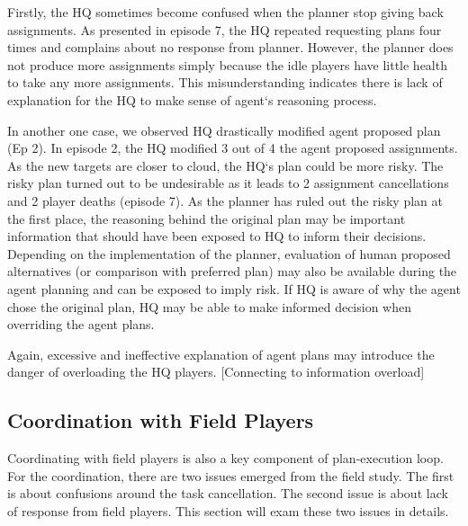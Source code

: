 Firstly, the HQ sometimes become confused when the planner stop giving back assignments. As presented in episode 7, the HQ repeated requesting plans four times and complains about no response from planner. However, the planner does not produce more assignments simply because the idle players have little health to take any more assignments. This misunderstanding indicates there is lack of explanation for the HQ to make sense of agent`s reasoning process. 

In another one case, we observed HQ drastically modified agent proposed plan (Ep 2). In episode 2, the HQ modified 3 out of 4 the agent proposed assignments. As the new targets are closer to cloud, the HQ`s plan could be more risky. The risky plan turned out to be undesirable as it leads to 2 assignment cancellations and 2 player deaths (episode 7). As the planner has ruled out the risky plan at the first place, the reasoning behind the original plan may be important information that should have been exposed to HQ to inform their decisions. Depending on the implementation of the planner, evaluation of human proposed alternatives (or comparison with preferred plan) may also be available during the agent planning and can be exposed to imply risk. If HQ is aware of why the agent chose the original plan, HQ may be able to make informed decision when overriding the agent plans. 

Again, excessive and ineffective explanation of agent plans may introduce the danger of overloading the HQ players.  [Connecting to information overload]

\subsection{Coordination with Field Players}
Coordinating with field players is also a key component of plan-execution loop. For the coordination, there are two issues emerged from the field study. The first is about confusions around the task cancellation. The second issue is about lack of response from field players. This section will exam these two issues in details.\\

